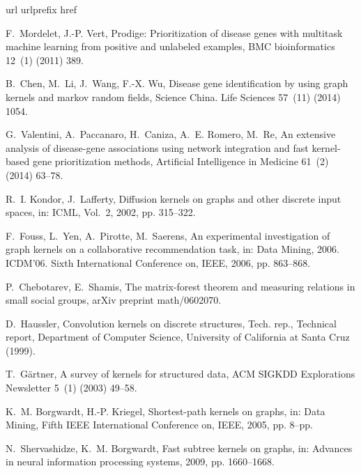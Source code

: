 \documentclass[review]{elsarticle}
\begin{document}
%
\begin{thebibliography}{10}
\expandafter\ifx\csname url\endcsname\relax
  \def\url#1{\texttt{#1}}\fi
\expandafter\ifx\csname urlprefix\endcsname\relax\def\urlprefix{URL }\fi
\expandafter\ifx\csname href\endcsname\relax
  \def\href#1#2{#2} \def\path#1{#1}\fi

F.~Mordelet, J.-P. Vert, Prodige: Prioritization of disease genes with
  multitask machine learning from positive and unlabeled examples, BMC
  bioinformatics 12~(1) (2011) 389.

B.~Chen, M.~Li, J.~Wang, F.-X. Wu, Disease gene identification by using graph
  kernels and markov random fields, Science China. Life Sciences 57~(11) (2014)
  1054.

G.~Valentini, A.~Paccanaro, H.~Caniza, A.~E. Romero, M.~Re, An extensive
  analysis of disease-gene associations using network integration and fast
  kernel-based gene prioritization methods, Artificial Intelligence in Medicine
  61~(2) (2014) 63--78.

R.~I. Kondor, J.~Lafferty, Diffusion kernels on graphs and other discrete input
  spaces, in: ICML, Vol.~2, 2002, pp. 315--322.

F.~Fouss, L.~Yen, A.~Pirotte, M.~Saerens, An experimental investigation of
  graph kernels on a collaborative recommendation task, in: Data Mining, 2006.
  ICDM'06. Sixth International Conference on, IEEE, 2006, pp. 863--868.

P.~Chebotarev, E.~Shamis, The matrix-forest theorem and measuring relations in
  small social groups, arXiv preprint math/0602070.

D.~Haussler, Convolution kernels on discrete structures, Tech. rep., Technical
  report, Department of Computer Science, University of California at Santa
  Cruz (1999).

T.~G{\"a}rtner, A survey of kernels for structured data, ACM SIGKDD
  Explorations Newsletter 5~(1) (2003) 49--58.

K.~M. Borgwardt, H.-P. Kriegel, Shortest-path kernels on graphs, in: Data
  Mining, Fifth IEEE International Conference on, IEEE, 2005, pp. 8--pp.

N.~Shervashidze, K.~M. Borgwardt, Fast subtree kernels on graphs, in: Advances
  in neural information processing systems, 2009, pp. 1660--1668.


\end{thebibliography}
\end{document}
